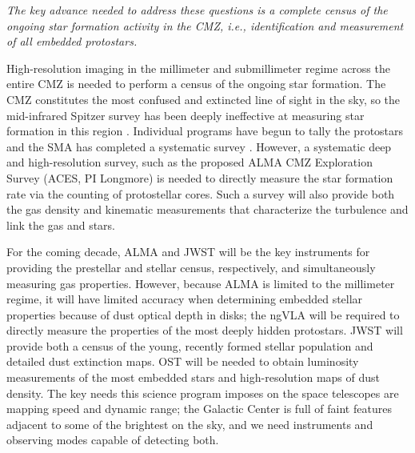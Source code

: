 \documentclass[modern]{aastex62}
\begin{document}
{\it
The key advance needed to address these questions is a complete census of the
ongoing star formation activity in the CMZ, i.e., identification and measurement
of all embedded protostars.}

High-resolution imaging in the millimeter and submillimeter regime across the
entire CMZ is needed to perform a census of the ongoing star formation.  The
CMZ constitutes the most confused and extincted line of sight in the sky, so
the mid-infrared Spitzer survey has been deeply ineffective at measuring star
formation in this region \citep{Koepferl2014a}. Individual programs have
begun to tally the protostars \citep[Walker et al, in prep, Barnes et al, in
prep]{Ginsburg2018a,Lu2019a} and the SMA has completed a systematic
survey \citep{Battersby2017a}. However, a systematic deep and high-resolution
survey, such as the proposed ALMA CMZ Exploration Survey (ACES, PI Longmore) is
needed to directly measure the star formation rate via the counting of
protostellar cores. Such a survey will also provide both the gas density and
kinematic measurements that characterize the turbulence and link the gas and
stars.


For the coming decade, ALMA and JWST will be the key instruments for providing
the prestellar and stellar census, respectively, and simultaneously measuring
gas properties.  However, because ALMA is limited to the millimeter regime,
it will have limited accuracy when determining embedded stellar properties because
of dust optical depth in disks; the ngVLA will be required to directly measure
the properties of the most deeply hidden protostars.  JWST will provide both
a census of the young, recently formed stellar population and detailed dust 
extinction maps.  OST will be needed to obtain luminosity measurements of the
most embedded stars and high-resolution maps of dust density.  The key needs
this science program imposes on the space telescopes are mapping speed
and dynamic range; the Galactic Center is full of faint features adjacent
to some of the brightest on the sky, and we need instruments and observing
modes capable of detecting both.
\end{document}
